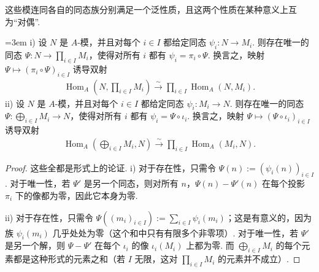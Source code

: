 这些模连同各自的同态族分别满足一个泛性质，且这两个性质在某种意义上互为``对偶''.
\begin{proposition*}
\emergencystretch=3em
i) 设 $N$ 是 $A$-模，并且对每个 $i\in I$ 都给定同态 $\psi_i\colon N\longrightarrow M_i$. 则存在唯一的同态 $\Psi\colon N\longrightarrow\prod_{i\in I}M_i$，使得对所有 $i$ 都有 $\psi_i=\pi_i\circ\Psi$. 换言之，映射 $\Psi\longmapsto(\pi_i\circ\Psi)_{i\in I}$ 诱导双射
\begin{align*}
 \operatorname{Hom}_A\left(N,\prod_{i\in I}M_i\right)\xrightarrow{\sim}\prod_{i\in I}\operatorname{Hom}_A(N,M_i).
\end{align*}
ii) 设 $N$ 是 $A$-模，并且对每个 $i\in I$ 都给定同态 $\psi_i\colon M_i\longrightarrow N$. 则存在唯一的同态 $\Psi\colon\bigoplus_{i\in I}M_i\longrightarrow N$，使得对所有 $i$ 都有 $\psi_i=\Psi\circ\iota_i$. 换言之，映射 $\Psi\longmapsto(\Psi\circ\iota_i)_{i\in I}$ 诱导双射
\begin{align*}
 \operatorname{Hom}_A\left(\bigoplus_{i\in I}M_i,N\right)\xrightarrow{\sim}\prod_{i\in I}\operatorname{Hom}_A(M_i,N).
\end{align*}
\end{proposition*}
\begin{proof}
这些全都是形式上的论证. i) 对于存在性，只需令 $\Psi(n):=(\psi_i(n))_{i\in I}$. 对于唯一性，若 $\Psi'$ 是另一个同态，则对所有 $n$，$\Psi(n)-\Psi'(n)$ 在每个投影 $\pi_i$ 下的像都为零，因此它本身为零.

 ii) 对于存在性，只需令 $\Psi((m_i)_{i\in I}):=\sum_{i\in I}\psi_i(m_i)$；这是有意义的，因为族 $\psi_i(m_i)$ 几乎处处为零（这个和中只有有限多个非零项）. 对于唯一性，若 $\Psi'$ 是另一个解，则 $\Psi-\Psi'$ 在每个 $\iota_i$ 的像 $\iota_i(M_i)$ 上都为零. 而 $\bigoplus_{i\in I}M_i$ 的每个元素都是这种形式的元素之和（若 $I$ 无限，这对 $\prod_{i\in I}M_i$ 的元素并不成立）.
\end{proof}





